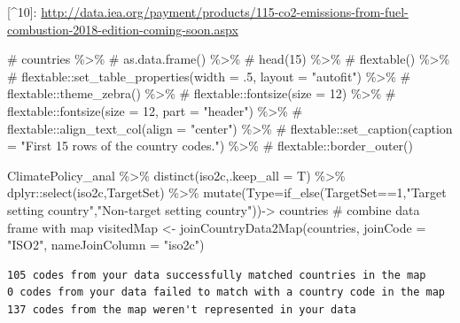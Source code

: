 \documentclass[
  letterpaper,
  DIV=11,
  numbers=noendperiod]{scrartcl}
\newenvironment{Shaded}{\begin{snugshade}}{\end{snugshade}}
\newcommand{\AttributeTok}[1]{\textcolor[rgb]{0.40,0.46,0.14}{#1}}
\newcommand{\CommentTok}[1]{\textcolor[rgb]{0.37,0.37,0.37}{#1}}
\newcommand{\DecValTok}[1]{\textcolor[rgb]{0.68,0.00,0.00}{#1}}
\newcommand{\FunctionTok}[1]{\textcolor[rgb]{0.28,0.35,0.67}{#1}}
\newcommand{\NormalTok}[1]{\textcolor[rgb]{0.00,0.46,0.62}{#1}}
\newcommand{\OtherTok}[1]{\textcolor[rgb]{0.00,0.46,0.62}{#1}}
\newcommand{\SpecialCharTok}[1]{\textcolor[rgb]{0.37,0.37,0.37}{#1}}
\newcommand{\StringTok}[1]{\textcolor[rgb]{0.13,0.47,0.30}{#1}}
\begin{document}
{[}\^{}10{]}:
\url{http://data.iea.org/payment/products/115-co2-emissions-from-fuel-combustion-2018-edition-coming-soon.aspx}

\begin{Shaded}
\begin{Highlighting}[]
\CommentTok{\# countries \%\textgreater{}\%}
\CommentTok{\#   as.data.frame() \%\textgreater{}\%}
\CommentTok{\#   head(15) \%\textgreater{}\%}
\CommentTok{\#   flextable() \%\textgreater{}\%}
\CommentTok{\#   flextable::set\_table\_properties(width = .5, layout = "autofit") \%\textgreater{}\%}
\CommentTok{\#   flextable::theme\_zebra() \%\textgreater{}\%}
\CommentTok{\#   flextable::fontsize(size = 12) \%\textgreater{}\%}
\CommentTok{\#   flextable::fontsize(size = 12, part = "header") \%\textgreater{}\%}
\CommentTok{\#   flextable::align\_text\_col(align = "center") \%\textgreater{}\%}
\CommentTok{\#   flextable::set\_caption(caption = "First 15 rows of the country codes.")  \%\textgreater{}\%}
\CommentTok{\#   flextable::border\_outer()}
\end{Highlighting}
\end{Shaded}

\begin{Shaded}
\begin{Highlighting}[]
\NormalTok{ClimatePolicy\_anal }\SpecialCharTok{\%\textgreater{}\%} 
  \FunctionTok{distinct}\NormalTok{(iso2c,}\AttributeTok{.keep\_all =}\NormalTok{ T) }\SpecialCharTok{\%\textgreater{}\%}
\NormalTok{  dplyr}\SpecialCharTok{::}\FunctionTok{select}\NormalTok{(iso2c,TargetSet) }\SpecialCharTok{\%\textgreater{}\%}
  \FunctionTok{mutate}\NormalTok{(}\AttributeTok{Type=}\FunctionTok{if\_else}\NormalTok{(TargetSet}\SpecialCharTok{==}\DecValTok{1}\NormalTok{,}\StringTok{"Target setting country"}\NormalTok{,}\StringTok{"Non{-}target setting country"}\NormalTok{))}\OtherTok{{-}\textgreater{}}\NormalTok{ countries}
\CommentTok{\# combine data frame with map}
\NormalTok{visitedMap }\OtherTok{\textless{}{-}} \FunctionTok{joinCountryData2Map}\NormalTok{(countries, }
                                  \AttributeTok{joinCode =} \StringTok{"ISO2"}\NormalTok{,}
                                  \AttributeTok{nameJoinColumn =} \StringTok{"iso2c"}\NormalTok{)}
\end{Highlighting}
\end{Shaded}

\begin{verbatim}
105 codes from your data successfully matched countries in the map
0 codes from your data failed to match with a country code in the map
137 codes from the map weren't represented in your data
\end{verbatim}
\end{document}
